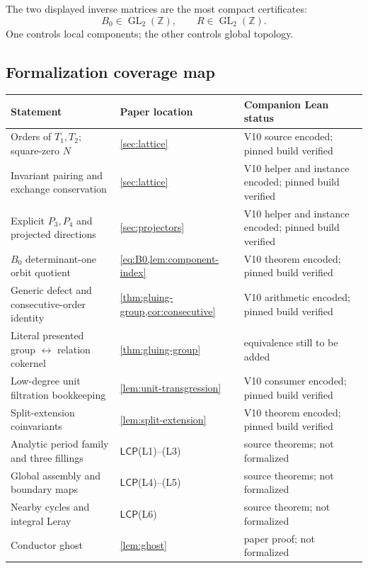 \documentclass[11pt,reqno]{amsart}
\numberwithin{equation}{section}
\newcommand{\Z}{\mathbb Z}
\newcommand{\LCP}{\mathsf{LCP}}
\theoremstyle{definition}
\begin{document}
The two displayed inverse matrices are the most compact certificates:
\[
B_0\in\operatorname{GL}_2(\Z),
\qquad
R\in\operatorname{GL}_2(\Z).
\]
One controls local components; the other controls global topology.


\subsection{Formalization coverage map}\label{sec:coverage}

\begin{center}
\small
\begin{tabularx}{\textwidth}{@{}X>{\raggedright\arraybackslash}p{}>{\raggedright\arraybackslash}p{}@{}}
\toprule
Statement & Paper location & Companion Lean status\\
\midrule
Orders of $T_1,T_2$; square-zero $N$ & \cref{sec:lattice} & V10 source encoded; pinned build verified\\
Invariant pairing and exchange conservation & \cref{sec:lattice} & V10 helper and instance encoded; pinned build verified\\
Explicit $P_3,P_4$ and projected directions & \cref{sec:projectors} & V10 helper and instance encoded; pinned build verified\\
$B_0$ determinant-one orbit quotient & \cref{eq:B0,lem:component-index} & V10 theorem encoded; pinned build verified\\
Generic defect and consecutive-order identity & \cref{thm:gluing-group,cor:consecutive} & V10 arithmetic encoded; pinned build verified\\
Literal presented group $\leftrightarrow$ relation cokernel & \cref{thm:gluing-group} & equivalence still to be added\\
Low-degree unit filtration bookkeeping & \cref{lem:unit-transgression} & V10 consumer encoded; pinned build verified\\
Split-extension coinvariants & \cref{lem:split-extension} & V10 theorem encoded; pinned build verified\\
Analytic period family and three fillings & $\LCP$(L1)--(L3) & source theorems; not formalized\\
Global assembly and boundary maps & $\LCP$(L4)--(L5) & source theorems; not formalized\\
Nearby cycles and integral Leray & $\LCP$(L6) & source theorem; not formalized\\
Conductor ghost & \cref{lem:ghost} & paper proof; not formalized\\
\bottomrule
\end{tabularx}
\end{center}
\end{document}
